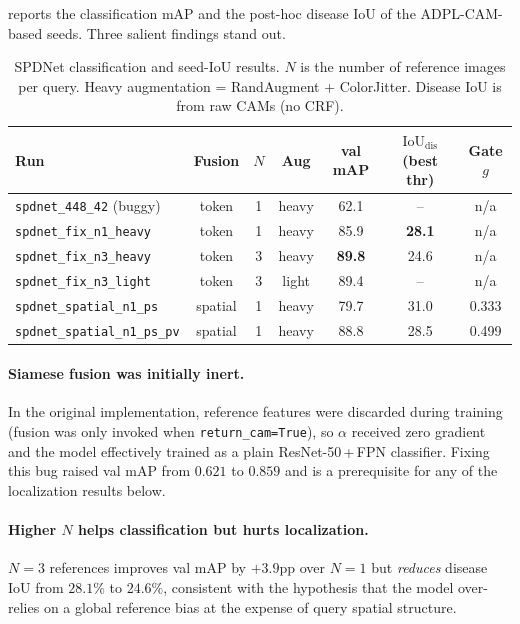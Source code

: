 \documentclass[11pt,a4paper]{article}
\newcommand{\IoU}{\mathrm{IoU}}
\begin{document}
 reports the classification mAP and the post-hoc
disease IoU of the ADPL-CAM-based seeds. Three salient findings stand
out.

\begin{table}[t]
\centering
\small
\caption{SPDNet classification and seed-IoU results. $N$ is the number of
reference images per query. Heavy augmentation = RandAugment + ColorJitter.
Disease IoU is from raw CAMs (no CRF).}
\label{tab:spdnet_cls}
\begin{tabular}{@{}lcccccc@{}}
\toprule
Run & Fusion & $N$ & Aug & val mAP & $\IoU_{\mathrm{dis}}$ (best thr) & Gate $g$\\
\midrule
\texttt{spdnet\_448\_42} (buggy)        & token   & 1 & heavy   & 62.1 & --    & n/a\\
\texttt{spdnet\_fix\_n1\_heavy}          & token   & 1 & heavy   & 85.9 & \textbf{28.1} & n/a\\
\texttt{spdnet\_fix\_n3\_heavy}          & token   & 3 & heavy   & \textbf{89.8} & 24.6 & n/a\\
\texttt{spdnet\_fix\_n3\_light}          & token   & 3 & light   & 89.4 & --   & n/a\\
\texttt{spdnet\_spatial\_n1\_ps}         & spatial & 1 & heavy   & 79.7 & 31.0 & 0.333\\
\texttt{spdnet\_spatial\_n1\_ps\_pv}     & spatial & 1 & heavy   & 88.8 & 28.5 & 0.499\\
\bottomrule
\end{tabular}
\end{table}

\paragraph{Siamese fusion was initially inert.}
In the original implementation, reference features were discarded during
training (fusion was only invoked when \texttt{return\_cam=True}), so
$\alpha$ received zero gradient and the model effectively trained as a
plain ResNet-50\,+\,FPN classifier. Fixing this bug raised val mAP from
$0.621$ to $0.859$ and is a prerequisite for any of the localization
results below.

\paragraph{Higher $N$ helps classification but hurts localization.}
$N{=}3$ references improves val mAP by $+3.9$pp over $N{=}1$ but
\emph{reduces} disease IoU from $28.1\%$ to $24.6\%$, consistent with
the hypothesis that the model over-relies on a global reference bias at
the expense of query spatial structure.
\end{document}

